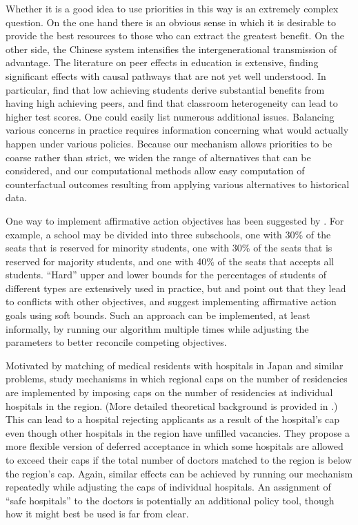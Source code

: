 \documentclass[12pt]{article}
\theoremstyle{definition}
\begin{document}
Whether it is a good idea to use priorities in this way is an extremely complex question.  On the one hand there is an obvious sense in which it is desirable to provide the best resources to those who can extract the greatest benefit.  On the other side, the Chinese system intensifies the intergenerational transmission of advantage.  The literature on peer effects in education \citep{EpRo11,Sac11} is extensive, finding significant effects with causal pathways that are not yet well understood.  In particular, \cite{BuSa13} find that low achieving students derive substantial benefits from having high achieving peers,  and  \cite{ViNe07} find that classroom heterogeneity can lead to higher test scores.
One could easily list numerous additional issues.  Balancing various concerns in practice requires information concerning what would actually happen under various policies.  Because our mechanism allows priorities to be coarse rather than strict, we widen the range of alternatives that can be considered, and our computational methods allow easy computation of counterfactual outcomes resulting from applying various alternatives to historical data.

One way to implement affirmative action objectives has been suggested by \cite{as03aer}.  For example, a school may be divided into three subschools, one with 30\% of the seats that is reserved for minority students, one with 30\% of the seats that is reserved for majority students, and one with 40\% of the seats that accepts all students. ``Hard'' upper and lower bounds for the percentages of students of different types are extensively used in practice, but \cite{Koj12} and \cite{HaYeYi13} point out that they lead to conflicts with other objectives, and \cite{EHYY14} suggest implementing affirmative action goals using soft bounds.  Such an approach can be implemented, at least informally, by running our algorithm multiple times while adjusting the parameters to better reconcile competing objectives.  

Motivated by matching of medical residents with hospitals in Japan and similar problems, \cite{KaKo15} study mechanisms in which regional caps on the number of residencies are implemented by imposing caps on the number of residencies at individual hospitals in the region.  (More detailed theoretical background is provided in \cite{KaKo17}.)  This can lead to a hospital rejecting applicants as a result of the hospital's cap even though other hospitals in the region have unfilled vacancies.  They propose a more flexible version of deferred acceptance in which some hospitals are allowed to exceed their caps if the total number of doctors matched to the region is below the region's cap.  Again, similar effects can be achieved by running our mechanism repeatedly while adjusting the caps of individual hospitals.  An assignment of ``safe hospitals'' to the doctors is potentially an additional policy tool, though how it might best be used is far from clear.
\end{document}
